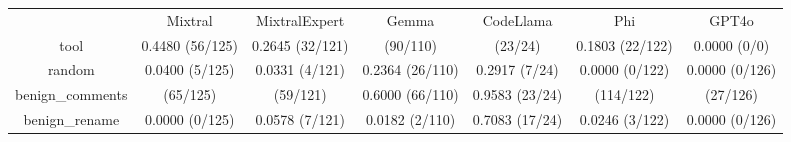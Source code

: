 \begin{table}[h!]
\centering
\begin{tabular}{|c|c|c|c|c|c|c|}
\hline
 & Mixtral & MixtralExpert & Gemma & CodeLlama & Phi & GPT4o \\

tool & 0.4480 (56/125) & 0.2645 (32/121) & \cellcolor{blue!10}{0.8182} (90/110) & \cellcolor{blue!10}{0.9583} (23/24) & 0.1803 (22/122) & 0.0000 (0/0) \\

random & 0.0400 (5/125) & 0.0331 (4/121) & 0.2364 (26/110) & 0.2917 (7/24) & 0.0000 (0/122) & 0.0000 (0/126) \\

benign_comments & \cellcolor{blue!10}{0.5200} (65/125) & \cellcolor{blue!10}{0.4876} (59/121) & 0.6000 (66/110) & 0.9583 (23/24) & \cellcolor{blue!10}{0.9344} (114/122) & \cellcolor{blue!10}{0.2143} (27/126) \\

benign_rename & 0.0000 (0/125) & 0.0578 (7/121) & 0.0182 (2/110) & 0.7083 (17/24) & 0.0246 (3/122) & 0.0000 (0/126) \\

\end{tabular}
\end{table}